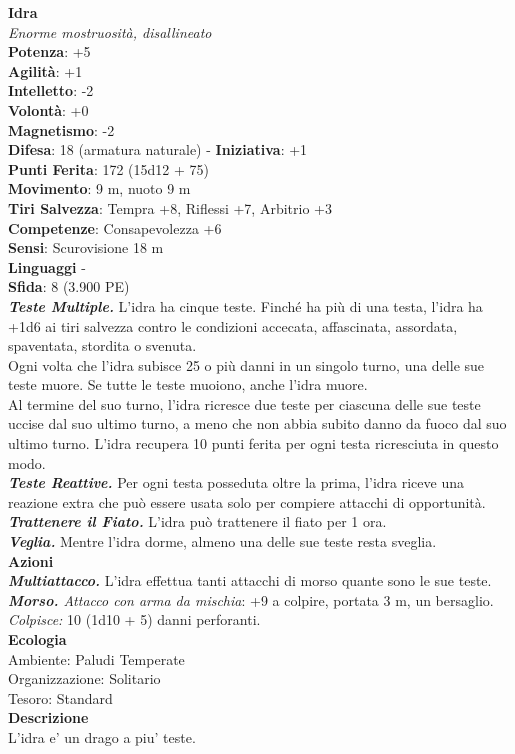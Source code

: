 \begin{multicols}{2}
\medskip\textbf{Idra}\\
\emph{Enorme mostruosità, disallineato}\\
\textbf{Potenza}: +5\\
\textbf{Agilità}: +1\\
\textbf{Intelletto}: -2\\
\textbf{Volontà}: +0\\
\textbf{Magnetismo}: -2\\
\textbf{Difesa}: 18 (armatura naturale) - \textbf{Iniziativa}: +1\\
\textbf{Punti Ferita}: 172 (15d12 + 75)\\
\textbf{Movimento}: 9 m, nuoto 9 m\\
\textbf{Tiri Salvezza}: Tempra +8, Riflessi +7, Arbitrio +3\\
\textbf{Competenze}: Consapevolezza +6\\
\textbf{Sensi}: Scurovisione 18 m\\
\textbf{Linguaggi} -\\
\textbf{Sfida}: 8 (3.900 PE)\smallskip\\
\emph{\textbf{Teste Multiple.}} L'idra ha cinque teste. Finché ha più di una testa, l'idra ha +1d6 ai tiri salvezza contro le condizioni accecata, affascinata, assordata, spaventata, stordita o svenuta.\\
Ogni volta che l'idra subisce 25 o più danni in un singolo turno, una delle sue teste muore. Se tutte le teste muoiono, anche l'idra muore.\\
Al termine del suo turno, l'idra ricresce due teste per ciascuna delle sue teste uccise dal suo ultimo turno, a meno che non abbia subito danno da fuoco dal suo ultimo turno. L'idra recupera 10 punti ferita per ogni testa ricresciuta in questo modo.\\
\emph{\textbf{Teste Reattive.}} Per ogni testa posseduta oltre la prima, l'idra riceve una reazione extra che può essere usata solo per compiere attacchi di opportunità.\\
\emph{\textbf{Trattenere il Fiato.}} L'idra può trattenere il fiato per 1 ora.\\
\emph{\textbf{Veglia.}} Mentre l'idra dorme, almeno una delle sue teste resta sveglia.\\
\smallskip\textbf{Azioni}\\
\emph{\textbf{Multiattacco.}} L'idra effettua tanti attacchi di morso quante sono le sue teste.\\
\emph{\textbf{Morso.} Attacco con arma da mischia}: +9 a colpire, portata 3 m, un bersaglio.\\
\emph{Colpisce:} 10 (1d10 + 5) danni perforanti. \\
\textbf{Ecologia}\\
Ambiente: Paludi Temperate\\
Organizzazione: Solitario\\
Tesoro: Standard\\
\textbf{Descrizione}\\
L'idra e' un drago a piu' teste.\\


\end{multicols}
